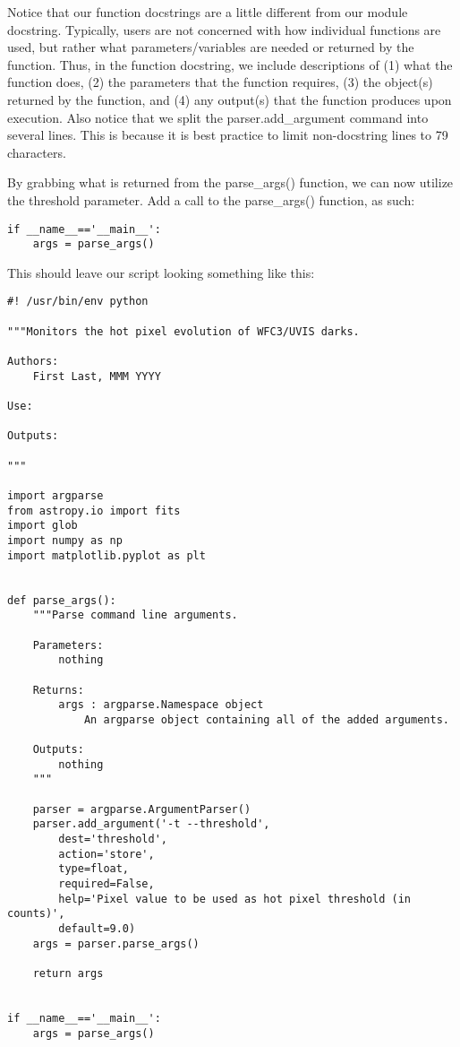 Notice that our function docstrings are a little different from our module docstring.  Typically,
users are not concerned with how individual functions are used, but rather what parameters/variables
are needed or returned by the function.  Thus, in the function docstring, we include descriptions of 
(1) what the function does, (2) the parameters that the function requires, (3) the object(s) returned 
by the function, and (4) any output(s) that the function produces upon execution.  Also notice that we 
split the {\sf\small parser.add\_argument} command into several lines.  This is
because it is best practice to limit non-docstring lines to 79 characters.

By grabbing what is returned from the {\sf\small parse\_args()} function, we can now
utilize the threshold parameter.  Add a call to the {\sf\small parse\_args()} function,
as such:

\begin{verbatim}
if __name__=='__main__':
    args = parse_args()
\end{verbatim}

This should leave our script looking something like this:

\begin{verbatim}
#! /usr/bin/env python

"""Monitors the hot pixel evolution of WFC3/UVIS darks.

Authors:
    First Last, MMM YYYY

Use:

Outputs:

"""

import argparse
from astropy.io import fits
import glob
import numpy as np
import matplotlib.pyplot as plt


def parse_args():
    """Parse command line arguments.

    Parameters:
        nothing

    Returns:
        args : argparse.Namespace object
            An argparse object containing all of the added arguments.

    Outputs:
        nothing
    """

    parser = argparse.ArgumentParser()
    parser.add_argument('-t --threshold',
        dest='threshold',
        action='store',
        type=float,
        required=False,
        help='Pixel value to be used as hot pixel threshold (in counts)',
        default=9.0)
    args = parser.parse_args()

    return args


if __name__=='__main__':
    args = parse_args()

\end{verbatim}

